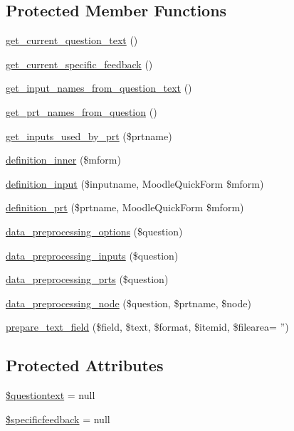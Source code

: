 \subsection*{Protected Member Functions}
\begin{DoxyCompactItemize}
\item 
\hyperlink{classqtype__stack__edit__form_a24a46bd5f95473cd7a5d4b2d2d3108f9}{get\_\-current\_\-question\_\-text} ()
\item 
\hyperlink{classqtype__stack__edit__form_a0a59b92397f1c334a7708a3dc9a9ba8b}{get\_\-current\_\-specific\_\-feedback} ()
\item 
\hyperlink{classqtype__stack__edit__form_a6731bfc0bbe8186535b4ac97720d7973}{get\_\-input\_\-names\_\-from\_\-question\_\-text} ()
\item 
\hyperlink{classqtype__stack__edit__form_ac826cc7492feb8b22e7b952c4d72b022}{get\_\-prt\_\-names\_\-from\_\-question} ()
\item 
\hyperlink{classqtype__stack__edit__form_a60fd5f24aa7d7540570f39439326a0c9}{get\_\-inputs\_\-used\_\-by\_\-prt} (\$prtname)
\item 
\hyperlink{classqtype__stack__edit__form_a7b5500d4881577b2207e954c3fe5f249}{definition\_\-inner} (\$mform)
\item 
\hyperlink{classqtype__stack__edit__form_a7f88936bea5c6ddfb0407ca5d9964166}{definition\_\-input} (\$inputname, MoodleQuickForm \$mform)
\item 
\hyperlink{classqtype__stack__edit__form_a24da883b98d3ee453a7a1aac5713f464}{definition\_\-prt} (\$prtname, MoodleQuickForm \$mform)
\item 
\hyperlink{classqtype__stack__edit__form_af17c9829d24c27226c62a059c209227a}{data\_\-preprocessing\_\-options} (\$question)
\item 
\hyperlink{classqtype__stack__edit__form_ae4163ca2550cf1be3aaa8455cfa53290}{data\_\-preprocessing\_\-inputs} (\$question)
\item 
\hyperlink{classqtype__stack__edit__form_af86fe81af07fff490d9c1f1d96dfc56c}{data\_\-preprocessing\_\-prts} (\$question)
\item 
\hyperlink{classqtype__stack__edit__form_a63b02f4a1cb4b1e3addbc437fb705161}{data\_\-preprocessing\_\-node} (\$question, \$prtname, \$node)
\item 
\hyperlink{classqtype__stack__edit__form_a6d3ed4f4c221ea06eb1375f07e81c583}{prepare\_\-text\_\-field} (\$field, \$text, \$format, \$itemid, \$filearea= '')
\end{DoxyCompactItemize}
\subsection*{Protected Attributes}
\begin{DoxyCompactItemize}
\item 
\hyperlink{classqtype__stack__edit__form_ac6ac60e3635c359ec4825035fe2f6e43}{\$questiontext} = null
\item 
\hyperlink{classqtype__stack__edit__form_af38852011faeae9174aa27df145bbca8}{\$specificfeedback} = null
\end{DoxyCompactItemize}


